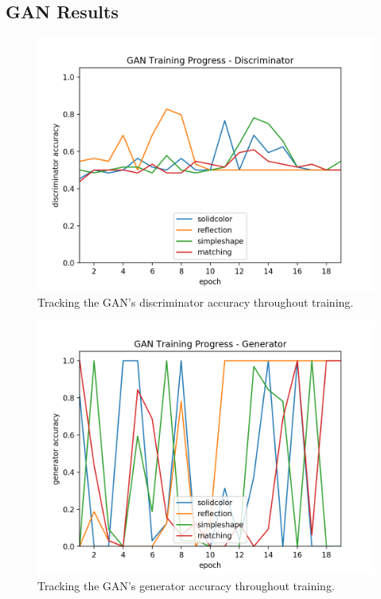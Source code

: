 \documentclass{article}
\begin{document}
\newpage

\subsection{GAN Results}

\begin{figure}[ht]
\label{fig:gan-discriminator-results}
\centering
\includegraphics[width=\textwidth]{gan-discriminator-results.png}
\caption{Tracking the GAN's discriminator accuracy throughout training.}
\end{figure}

\begin{figure}[ht]
\label{fig:gan-generator-results}
\centering
\includegraphics[width=\textwidth]{gan-generator-results.png}
\caption{Tracking the GAN's generator accuracy throughout training.}
\end{figure}
\end{document}
